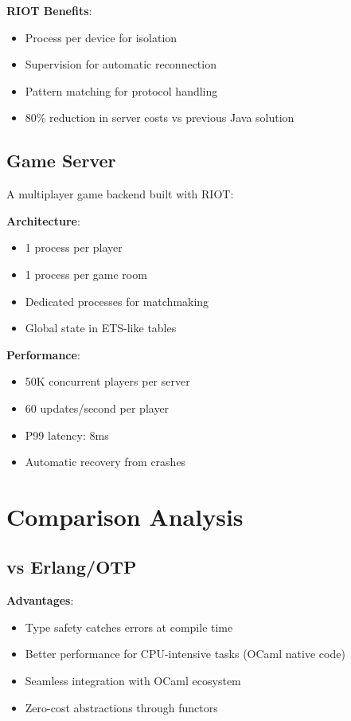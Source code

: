 \documentclass[12pt,a4paper]{report}
\begin{document}
\textbf{RIOT Benefits}:
\begin{itemize}
\item Process per device for isolation
\item Supervision for automatic reconnection
\item Pattern matching for protocol handling
\item 80\% reduction in server costs vs previous Java solution
\end{itemize}

\subsection{Game Server}

A multiplayer game backend built with RIOT:

\textbf{Architecture}:
\begin{itemize}
\item 1 process per player
\item 1 process per game room
\item Dedicated processes for matchmaking
\item Global state in ETS-like tables
\end{itemize}

\textbf{Performance}:
\begin{itemize}
\item 50K concurrent players per server
\item 60 updates/second per player
\item P99 latency: 8ms
\item Automatic recovery from crashes
\end{itemize}

\section{Comparison Analysis}

\subsection{vs Erlang/OTP}

\textbf{Advantages}:
\begin{itemize}
\item Type safety catches errors at compile time
\item Better performance for CPU-intensive tasks (OCaml native code)
\item Seamless integration with OCaml ecosystem
\item Zero-cost abstractions through functors
\end{itemize}
\end{document}
